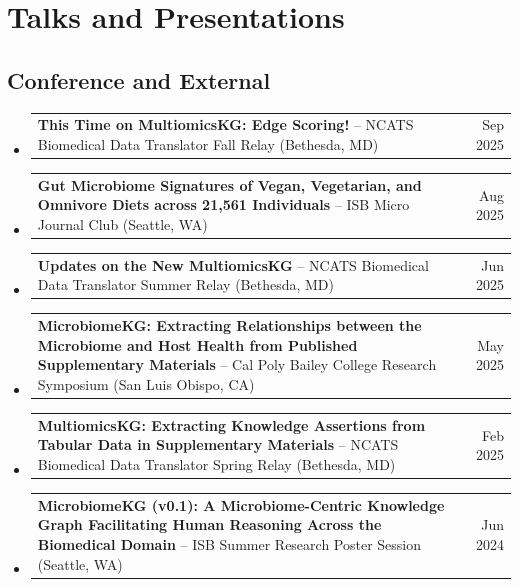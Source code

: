 \documentclass[11pt]{moderncv}
\begin{document}
\section{Talks and Presentations}
\subsection*{Conference and External}
\begin{itemize}[leftmargin=*]
\item \begin{tabularx}{\linewidth}{@{}>{\raggedright\arraybackslash}X r@{}}
\textbf{This Time on MultiomicsKG: Edge Scoring!} --
NCATS Biomedical Data Translator Fall Relay (Bethesda, MD) & Sep 2025 \\
\end{tabularx}
\item \begin{tabularx}{\linewidth}{@{}>{\raggedright\arraybackslash}X r@{}}
\textbf{Gut Microbiome Signatures of Vegan, Vegetarian, and Omnivore Diets across 21,561 Individuals} --
ISB Micro Journal Club (Seattle, WA) & Aug 2025 \\
\end{tabularx}
\item \begin{tabularx}{\linewidth}{@{}>{\raggedright\arraybackslash}X r@{}}
\textbf{Updates on the New MultiomicsKG} --
NCATS Biomedical Data Translator Summer Relay (Bethesda, MD) & Jun 2025 \\
\end{tabularx}
\item \begin{tabularx}{\linewidth}{@{}>{\raggedright\arraybackslash}X r@{}}
\textbf{MicrobiomeKG: Extracting Relationships between the Microbiome and Host Health from Published Supplementary Materials} --
Cal Poly Bailey College Research Symposium (San Luis Obispo, CA) & May 2025 \\
\end{tabularx}
\item \begin{tabularx}{\linewidth}{@{}>{\raggedright\arraybackslash}X r@{}}
\textbf{MultiomicsKG: Extracting Knowledge Assertions from Tabular Data in Supplementary Materials} --
NCATS Biomedical Data Translator Spring Relay (Bethesda, MD) & Feb 2025 \\
\end{tabularx}
\item \begin{tabularx}{\linewidth}{@{}>{\raggedright\arraybackslash}X r@{}}
\textbf{MicrobiomeKG (v0.1): A Microbiome-Centric Knowledge Graph Facilitating Human Reasoning Across the Biomedical Domain} --
ISB Summer Research Poster Session (Seattle, WA) & Jun 2024 \\
\end{tabularx}
\end{itemize}
\end{document}
